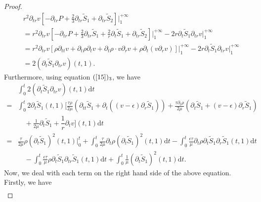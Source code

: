 \documentclass[10pt,reqno]{amsart}
\numberwithin{equation}{section}
\begin{document}
\begin{proof}
		\begin{equation}
			\begin{aligned}
				&r^2  \partial_{tr}v\left[-\partial_{tr}P+\frac{2}{3}\partial_{tr}\tilde{S}_1
				+\partial_{tr}\tilde{S}_2\right]\bigg|_{1}^{+\infty}\\
				&=r^2  \partial_{tr}v\left[-\partial_{tr}P+\frac{2}{3}\partial_{tr}\tilde{S}_1+\frac{2}{r}\partial_{t}\tilde{S}_1
				+\partial_{tr}\tilde{S}_2\right]\bigg|_{1}^{+\infty}-2r\partial_{t}\tilde{S}_1\partial_{tr}v\bigg|_{1}^{+\infty}\\
				&=r^2  \partial_{tr}v[\rho\partial_{tt} v+\partial_t \rho  \partial_t v+\partial_t \rho \cdot v \partial_r v+\rho \partial_t( v \partial_r v)]\bigg|_{1}^{+\infty}
				-2r\partial_{t}\tilde{S}_1\partial_{tr}v\bigg|_{1}^{+\infty}\\
				&=2(\partial_{t}\tilde{S}_1\partial_{tr}v)(t,1).
			\end{aligned}
		\end{equation}
		Furthermore, using equation $(\ref{15})_3$, we have
		\begin{equation}
			\begin{aligned}\nonumber
				&\int_{0}^{t}2(\partial_{t}\tilde{S}_1\partial_{tr}v)(t,1)\mathrm{d}t\\
				=&\int_{0}^{t} 2\partial_{t}\tilde{S}_1(t,1)
				\bigg[\frac{\tau\rho}{2\mu} \left(\partial_{tt} \tilde{S}_1+\partial_t ((v-\epsilon)\partial_r\tilde{S}_1) \right) +\frac{\tau\partial_{t}\rho}{2\mu} \left(\partial_t \tilde{S}_1+(v-\epsilon)\partial_r\tilde{S}_1 \right) \\
				&\quad+\frac{1}{2\mu}\partial_t \tilde{S}_1+\dfrac{1}{r}\partial_t v\bigg](t,1)
				\mathrm{d}t\\
				=&\frac{\tau}{2\mu}\rho(\partial_{t}\tilde{S}_1)^2(t,1)\big|_0^t
				+\int_{0}^{t}\frac{\tau}{2\mu}\partial_{t}\rho(\partial_{t}\tilde{S}_1)^2(t,1)\mathrm{d}t
				-\int_{0}^{t}\frac{\epsilon\tau}{\mu}\partial_{t}\rho\partial_{t}\tilde{S}_1\partial_{r}\tilde{S}_1(t,1)\mathrm{d}t\\
				&\quad-\int_{0}^{t}\frac{\epsilon\tau}{\mu}\rho\partial_{t}\tilde{S}_1\partial_{tr}\tilde{S}_1(t,1)\mathrm{d}t
				+\int_{0}^{t}\frac{1}{\mu}(\partial_{t}\tilde{S}_1)^2(t,1)\mathrm{d}t.
			\end{aligned}
		\end{equation}
		Now, we deal with each term on the right hand side of the above equation. Firstly, we have 
		\begin{equation}\nonumber
			\begin{aligned}

\end{aligned}
\end{equation}
\end{proof}
\end{document}
